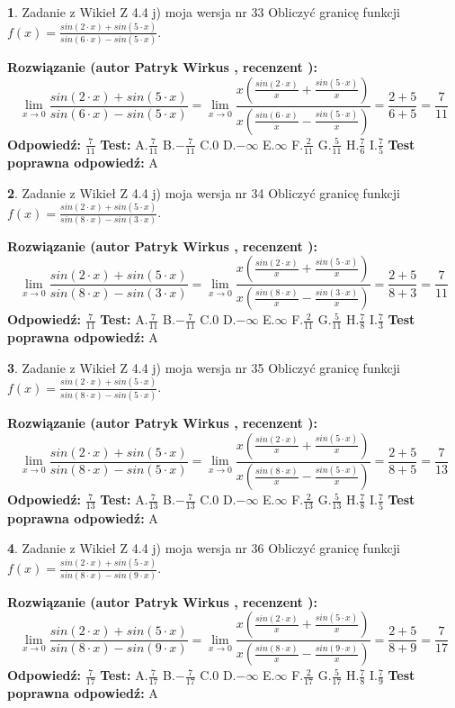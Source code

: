 \documentclass[12pt, a4paper]{article}
\theoremstyle{definition} %
\newtheorem{zad}{}
\newcommand{\zadStart}[1]{\begin{zad}#1\newline}
\newcommand{\zadStop}{\end{zad}}
\newcommand{\rozwStart}[2]{\noindent \textbf{Rozwiązanie (autor #1 , recenzent #2): }\newline}
\newcommand{\rozwStop}{\newline}
\newcommand{\odpStart}{\noindent \textbf{Odpowiedź:}\newline}
\newcommand{\odpStop}{\newline}
\newcommand{\testStart}{\noindent \textbf{Test:}\newline}
\newcommand{\testStop}{\newline}
\newcommand{\kluczStart}{\noindent \textbf{Test poprawna odpowiedź:}\newline}
\newcommand{\kluczStop}{\newline}
\begin{document}
\zadStart{Zadanie z Wikieł Z 4.4 j) moja wersja nr 33}
Obliczyć granicę funkcji $f(x)=\frac{sin(2\cdot x) +sin(5\cdot x)}{sin(6\cdot x) -sin(5\cdot x)}$.
\zadStop
\rozwStart{Patryk Wirkus}{}
$$\lim\limits_{x\to 0}\frac{sin(2\cdot x) +sin(5\cdot x)}{sin(6\cdot x) -sin(5\cdot x)}=\lim\limits_{x\to 0}\frac{x(\frac{sin(2\cdot x)}{x}+\frac{sin(5\cdot x)}{x})}{x(\frac{sin(6\cdot x)}{x}-\frac{sin(5\cdot x)}{x})}=\frac{2+5}{6+5} = \frac{7}{11}$$
\rozwStop
\odpStart
$\frac{7}{11}$
\odpStop
\testStart
A.$\frac{7}{11}$
B.$-\frac{7}{11}$
C.$0$
D.$-\infty$
E.$\infty$
F.$\frac{2}{11}$
G.$\frac{5}{11}$
H.$\frac{7}{6}$
I.$\frac{7}{5}$
\testStop
\kluczStart
A
\kluczStop



\zadStart{Zadanie z Wikieł Z 4.4 j) moja wersja nr 34}
Obliczyć granicę funkcji $f(x)=\frac{sin(2\cdot x) +sin(5\cdot x)}{sin(8\cdot x) -sin(3\cdot x)}$.
\zadStop
\rozwStart{Patryk Wirkus}{}
$$\lim\limits_{x\to 0}\frac{sin(2\cdot x) +sin(5\cdot x)}{sin(8\cdot x) -sin(3\cdot x)}=\lim\limits_{x\to 0}\frac{x(\frac{sin(2\cdot x)}{x}+\frac{sin(5\cdot x)}{x})}{x(\frac{sin(8\cdot x)}{x}-\frac{sin(3\cdot x)}{x})}=\frac{2+5}{8+3} = \frac{7}{11}$$
\rozwStop
\odpStart
$\frac{7}{11}$
\odpStop
\testStart
A.$\frac{7}{11}$
B.$-\frac{7}{11}$
C.$0$
D.$-\infty$
E.$\infty$
F.$\frac{2}{11}$
G.$\frac{5}{11}$
H.$\frac{7}{8}$
I.$\frac{7}{3}$
\testStop
\kluczStart
A
\kluczStop



\zadStart{Zadanie z Wikieł Z 4.4 j) moja wersja nr 35}
Obliczyć granicę funkcji $f(x)=\frac{sin(2\cdot x) +sin(5\cdot x)}{sin(8\cdot x) -sin(5\cdot x)}$.
\zadStop
\rozwStart{Patryk Wirkus}{}
$$\lim\limits_{x\to 0}\frac{sin(2\cdot x) +sin(5\cdot x)}{sin(8\cdot x) -sin(5\cdot x)}=\lim\limits_{x\to 0}\frac{x(\frac{sin(2\cdot x)}{x}+\frac{sin(5\cdot x)}{x})}{x(\frac{sin(8\cdot x)}{x}-\frac{sin(5\cdot x)}{x})}=\frac{2+5}{8+5} = \frac{7}{13}$$
\rozwStop
\odpStart
$\frac{7}{13}$
\odpStop
\testStart
A.$\frac{7}{13}$
B.$-\frac{7}{13}$
C.$0$
D.$-\infty$
E.$\infty$
F.$\frac{2}{13}$
G.$\frac{5}{13}$
H.$\frac{7}{8}$
I.$\frac{7}{5}$
\testStop
\kluczStart
A
\kluczStop



\zadStart{Zadanie z Wikieł Z 4.4 j) moja wersja nr 36}
Obliczyć granicę funkcji $f(x)=\frac{sin(2\cdot x) +sin(5\cdot x)}{sin(8\cdot x) -sin(9\cdot x)}$.
\zadStop
\rozwStart{Patryk Wirkus}{}
$$\lim\limits_{x\to 0}\frac{sin(2\cdot x) +sin(5\cdot x)}{sin(8\cdot x) -sin(9\cdot x)}=\lim\limits_{x\to 0}\frac{x(\frac{sin(2\cdot x)}{x}+\frac{sin(5\cdot x)}{x})}{x(\frac{sin(8\cdot x)}{x}-\frac{sin(9\cdot x)}{x})}=\frac{2+5}{8+9} = \frac{7}{17}$$
\rozwStop
\odpStart
$\frac{7}{17}$
\odpStop
\testStart
A.$\frac{7}{17}$
B.$-\frac{7}{17}$
C.$0$
D.$-\infty$
E.$\infty$
F.$\frac{2}{17}$
G.$\frac{5}{17}$
H.$\frac{7}{8}$
I.$\frac{7}{9}$
\testStop
\kluczStart
A
\kluczStop
\end{document}
